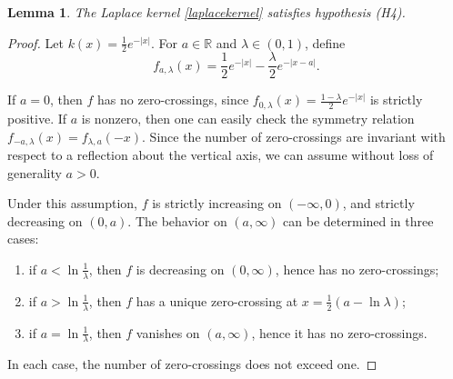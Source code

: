 \documentclass[11pt]{article}
\newtheorem{lem}[thm]{Lemma}
\theoremstyle{definition}
\numberwithin{equation}{section}
\numberwithin{thm}{section}
\begin{document}
%
%
%
%
%

\begin{lem} \label{laplaceproof}
The Laplace kernel \eqref{laplacekernel} satisfies hypothesis (H4).
\end{lem}

\begin{proof}
Let $k(x)=\frac{1}{2}e^{-|x|}$. For $a \in \mathbb R$ and $\lambda \in (0,1)$, define
\begin{equation}
f_{a,\lambda}(x)= \frac{1}{2} e^{-|x|} - \frac{\lambda}{2}e^{-|x-a|}.
\end{equation}

If $a=0$, then $f$ has no zero-crossings, since $f_{0,\lambda}(x)=\frac{1-\lambda}{2}e^{-|x|}$ is strictly positive. If $a$ is nonzero, then one can easily check the symmetry relation $f_{-a,\lambda}(x)=f_{\lambda,a}(-x)$. Since the number of zero-crossings are invariant with respect to a reflection about the vertical axis, we can assume without loss of generality $a>0$.

Under this assumption, $f$ is strictly increasing on $(-\infty,0)$, and strictly decreasing on $(0,a)$. The behavior on $(a,\infty)$ can be determined in three cases:

\begin{enumerate}[{Case} 1.)]
\item if $a<\ln\frac{1}{\lambda}$, then $f$ is decreasing on $(0,\infty)$, hence has no zero-crossings;
\item if $a>\ln\frac{1}{\lambda}$, then $f$ has a unique zero-crossing at $x=\frac{1}{2}(a-\ln\lambda)$;
\item if $a=\ln\frac{1}{\lambda}$, then $f$ vanishes on $(a,\infty)$, hence it has no zero-crossings.
\end{enumerate}
In each case, the number of zero-crossings does not exceed one.
\end{proof}
\end{document}
